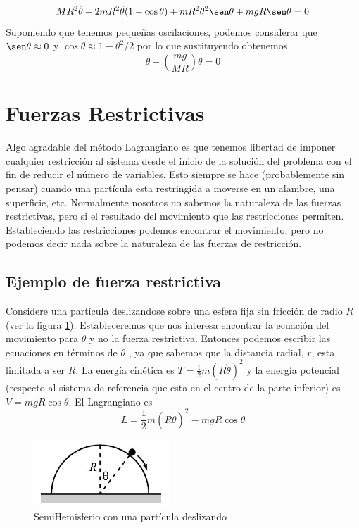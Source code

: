 \documentclass[12pt]{book}
\theoremstyle{definition}
\theoremstyle{remark}
\theoremstyle{plain}
\begin{document}
\begin{equation}
\label{equ035}
M R^2 \ddot{\theta}+ 2 m R^2 \ddot{\theta}(1-\cos \theta)+ m R^2 \dot{\theta}^2 \sen \theta+  m g R \sen \theta =0
\end{equation}
Suponiendo que tenemos pequeñas oscilaciones, podemos considerar que $\sen \theta \approx 0$ y $\cos \theta \approx 1 - \theta ^2/2$ por lo que sustituyendo obtenemos
\begin{equation}
\label{equ036}
\ddot{\theta} + \left ( \frac{m g}{M R} \right ) \theta =0
\end{equation}

\section{Fuerzas Restrictivas}
Algo agradable del método Lagrangiano es que tenemos libertad de imponer cualquier restricción al sistema desde el inicio de la solución del problema con el fin de reducir el número de variables. Esto siempre se hace (probablemente sin pensar) cuando una partícula esta restringida a moverse en un alambre, una superficie, etc. Normalmente nosotros no sabemos la naturaleza de las fuerzas restrictivas, pero si el resultado del movimiento que las restricciones permiten. Estableciendo las restricciones podemos encontrar el movimiento, pero no podemos decir nada sobre la naturaleza de las fuerzas de restricción.
\subsection{Ejemplo de fuerza restrictiva}

Considere una partícula deslizandose sobre una esfera fija sin fricción de radio $R$ (ver la figura \ref{fig103}). Estableceremos que nos interesa encontrar la ecuación del movimiento para $\theta$ y no la fuerza restrictiva. Entonces podemos escribir las ecuaciones en términos de $\theta$ , ya que sabemos que la distancia radial, $r$, esta limitada a ser $R$. La energía cinética es $T= \frac{1}{2} m (R \dot{\theta}) ^2$ y la energía potencial (respecto al sistema de referencia que esta en el centro de la parte inferior) es $V=m g R \cos \theta$. El Lagrangiano es
\begin{equation}
\label{equ037}
L =  \frac{1}{2} m (R \dot{\theta}) ^2 -m g R \cos \theta
\end{equation}

\begin{figure}
\centering
\includegraphics[width=2in]{hemisferio.jpg}
\caption{SemiHemisferio con una partícula deslizando}
\label{fig103}
\end{figure}
\end{document}
